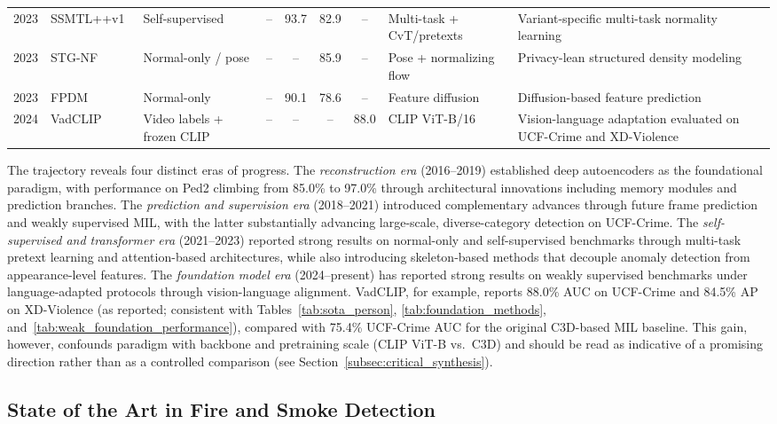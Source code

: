 \documentclass[10pt,a4paper]{article}
\begin{document}
\begin{table}[!t]
{\begin{tabular}{c p{3.1cm} p{3.0cm} c c c c p{3.0cm} p{4.6cm}}
2023 & SSMTL++v1~\citep{barbalau2023ssmtl} & Self-supervised & -- & 93.7 & 82.9 & -- & Multi-task + CvT/pretexts & Variant-specific multi-task normality learning \\
2023 & STG-NF~\citep{hirschorn2023normalizing} & Normal-only / pose & -- & -- & 85.9 & -- & Pose + normalizing flow & Privacy-lean structured density modeling \\
2023 & FPDM~\citep{yan2023feature} & Normal-only & -- & 90.1 & 78.6 & -- & Feature diffusion & Diffusion-based feature prediction \\
2024 & VadCLIP~\citep{wu2024vadclip} & Video labels + frozen CLIP & -- & -- & -- & 88.0 & CLIP ViT-B/16 & Vision-language adaptation evaluated on UCF-Crime and XD-Violence \\
\bottomrule
\end{tabular}%
}
\end{table}


The trajectory reveals four distinct eras of progress. The \textit{reconstruction era} (2016--2019) established deep autoencoders as the foundational paradigm, with performance on Ped2 climbing from 85.0\% to 97.0\% through architectural innovations including memory modules and prediction branches. The \textit{prediction and supervision era} (2018--2021) introduced complementary advances through future frame prediction and weakly supervised MIL, with the latter substantially advancing large-scale, diverse-category detection on UCF-Crime. The \textit{self-supervised and transformer era} (2021--2023) reported strong results on normal-only and self-supervised benchmarks through multi-task pretext learning and attention-based architectures, while also introducing skeleton-based methods that decouple anomaly detection from appearance-level features. The \textit{foundation model era} (2024--present) has reported strong results on weakly supervised benchmarks under language-adapted protocols through vision-language alignment. VadCLIP, for example, reports 88.0\% AUC on UCF-Crime and 84.5\% AP on XD-Violence (as reported; consistent with Tables~\ref{tab:sota_person}, \ref{tab:foundation_methods}, and~\ref{tab:weak_foundation_performance}), compared with 75.4\% UCF-Crime AUC for the original C3D-based MIL baseline. This gain, however, confounds paradigm with backbone and pretraining scale (CLIP ViT-B vs.\ C3D) and should be read as indicative of a promising direction rather than as a controlled comparison (see Section~\ref{subsec:critical_synthesis}).


\subsection{State of the Art in Fire and Smoke Detection}
\label{subsec:sota_fire}
\end{document}
